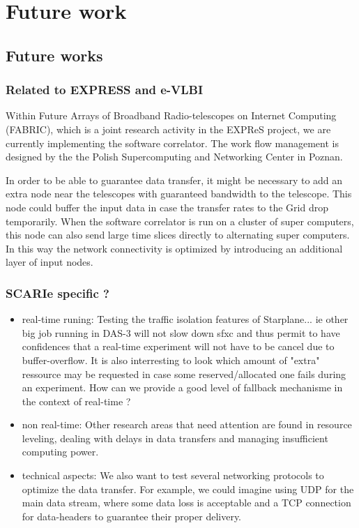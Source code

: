 \section{Future work}\label{sec:futurework}

\subsection{Future works}

\subsubsection{Related to EXPRESS and e-VLBI}
Within Future Arrays of Broadband Radio-telescopes on Internet
Computing (FABRIC), which is a joint research activity in the EXPReS
project, we are currently implementing the software correlator. The
work flow management is designed by the the Polish Supercomputing and
Networking Center in Poznan.

In order to be able to guarantee data transfer, it might be necessary
to add an extra node near the telescopes with guaranteed bandwidth to
the telescope. This node could buffer the input data in case the
transfer rates to the Grid drop temporarily. When the software
correlator is run on a cluster of super computers, this node can also
send large time slices directly to alternating super computers. In
this way the network connectivity is optimized by introducing an
additional layer of input nodes.

\subsubsection{SCARIe specific ?}
\begin{itemize}
\item real-time runing: Testing the traffic isolation features of Starplane... ie other big job running 
in DAS-3 will not slow down sfxc and thus permit to have confidences 
that a real-time experiment will not have to be cancel due to 
buffer-overflow. It is also interresting to look which amount of "extra" ressource
may be requested in case some reserved/allocated one fails during an experiment. 
How can we provide a good level of fallback mechanisme in the context of real-time ?
\item non real-time: Other research areas that need attention are found in resource
leveling, dealing with delays in data transfers and managing
insufficient computing power.
\item technical aspects: We also want to test several networking protocols to optimize the data
transfer. For example, we could imagine using UDP for the main data
stream, where some data loss is acceptable and a TCP connection for
data-headers to guarantee their proper delivery.
\end{itemize}


